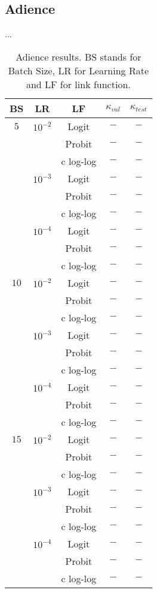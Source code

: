 \documentclass[10pt, a4paper, titlepage]{article}
\begin{document}
\begin{multicols}{2}
	\subsection{Adience}
	...
	
	\begin{table}[H]
		\footnotesize
		\centering
		\begin{tabular}{ccc|cc}
			BS & LR & LF & $\kappa_{val}$ & $\kappa_{test}$\\\hline\addlinespace[0.05cm]
			$5$ & $10^{-2}$ & Logit & $-$ & $-$\\
			& & Probit & $-$ & $-$\\
			& & c log-log & $-$ & $-$\\
			& $10^{-3}$ & Logit & $-$ & $-$\\
			& & Probit & $-$ & $-$\\
			& & c log-log & $-$ & $-$\\
			& $10^{-4}$ & Logit & $-$ & $-$\\
			& & Probit & $-$ & $-$\\
			& & c log-log & $-$ & $-$\\
			$10$ & $10^{-2}$ & Logit & $-$ & $-$\\
			& & Probit & $-$ & $-$\\
			& & c log-log & $-$ & $-$\\
			& $10^{-3}$ & Logit & $-$ & $-$\\
			& & Probit & $-$ & $-$\\
			& & c log-log & $-$ & $-$\\
			& $10^{-4}$ & Logit & $-$ & $-$\\
			& & Probit & $-$ & $-$\\
			& & c log-log & $-$ & $-$\\
			$15$ & $10^{-2}$ & Logit & $-$ & $-$\\
			& & Probit & $-$ & $-$\\
			& & c log-log & $-$ & $-$\\
			& $10^{-3}$ & Logit & $-$ & $-$\\
			& & Probit & $-$ & $-$\\
			& & c log-log & $-$ & $-$\\
			& $10^{-4}$ & Logit & $-$ & $-$\\
			& & Probit & $-$ & $-$\\
			& & c log-log & $-$ & $-$
		\end{tabular}
		\caption{Adience results. BS stands for Batch Size, LR for Learning Rate and LF for link function.}
		\label{table:Adienceresults}
	\end{table}
	

\end{multicols}
\end{document}
